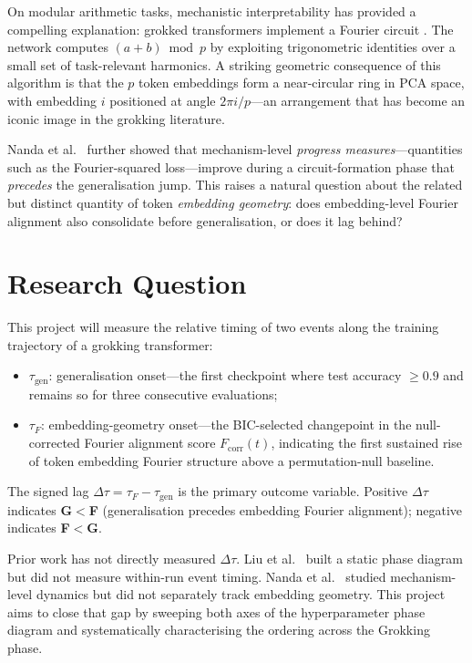 \documentclass[12pt,openany,a4paper]{book}
\newcommand{\taug}{\tau_{\mathrm{gen}}}
\newcommand{\tauf}{\tau_{F}}
\newcommand{\Dtau}{\Delta\tau}
\newcommand{\fcorr}{F_{\mathrm{corr}}}
\begin{document}
On modular arithmetic tasks, mechanistic interpretability
\cite{olah2020circuits} has provided a compelling explanation:
grokked transformers implement a Fourier circuit
\cite{nanda2023progress}.
The network computes $(a+b)\bmod p$ by exploiting trigonometric
identities over a small set of task-relevant harmonics.
A striking geometric consequence of this algorithm is that the $p$
token embeddings form a near-circular ring in PCA space, with
embedding $i$ positioned at angle $2\pi i/p$---an arrangement that
has become an iconic image in the grokking literature.

Nanda et al.\ \cite{nanda2023progress} further showed that mechanism-level
\emph{progress measures}---quantities such as the Fourier-squared
loss---improve during a circuit-formation phase that \emph{precedes}
the generalisation jump.
This raises a natural question about the related but distinct quantity
of token \emph{embedding geometry}: does embedding-level Fourier
alignment also consolidate before generalisation, or does it lag behind?

\section{Research Question}

This project will measure the relative timing of two events along
the training trajectory of a grokking transformer:
\begin{itemize}
  \item $\taug$: generalisation onset---the first checkpoint where test
    accuracy $\geq 0.9$ and remains so for three consecutive evaluations;
  \item $\tauf$: embedding-geometry onset---the BIC-selected changepoint
    in the null-corrected Fourier alignment score $\fcorr(t)$, indicating
    the first sustained rise of token embedding Fourier structure above
    a permutation-null baseline.
\end{itemize}
The signed lag $\Dtau = \tauf - \taug$ is the primary outcome variable.
Positive $\Dtau$ indicates \textbf{G$<$F} (generalisation precedes
embedding Fourier alignment); negative indicates \textbf{F$<$G}.

Prior work has not directly measured $\Dtau$.
Liu et al.\ \cite{liu2022towards} built a static phase diagram but did
not measure within-run event timing.
Nanda et al.\ \cite{nanda2023progress} studied mechanism-level dynamics
but did not separately track embedding geometry.
This project aims to close that gap by sweeping both axes of the
hyperparameter phase diagram and systematically characterising the
ordering across the Grokking phase.
\end{document}
